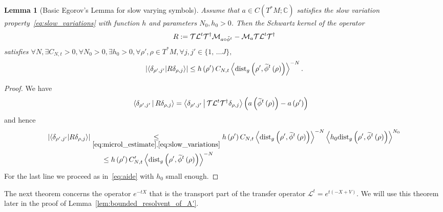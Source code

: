 \documentclass[10pt]{amsart}
\newtheorem{lemm}[theo]{Lemma}\newtheorem{prop}[theo]{Proposition}\newtheorem{coro}[theo]{Corollary}\newtheorem{conj}[theo]{Conjecture}
\theoremstyle{definition}\newtheorem{defi}[theo]{Definition}\newtheorem{rema}[theo]{Remark}\newtheorem{exam}[theo]{Example}\newtheorem{exem}[theo]{Example}\newtheorem{nota}[theo]{Notation}
\newcommand{\clT}{\mathcal{T}}
\newcommand{\clL}{\mathcal{L}}
\newcommand{\clM}{\mathcal{M}}
\newcommand{\dist}{\mathrm{dist}}
\newcommand{\bbC}{\mathbb{C}}
\let\oldtilde\tilde
\renewcommand*{\tilde}[1]{\mathchoice{\widetilde{#1}}{\widetilde{#1}}{\oldtilde{#1}}{\oldtilde{#1}}}
\let\oldexists\exists
\renewcommand*{\exists}{\mathrel{\oldexists}}
\let\oldforall\forall
\renewcommand*{\forall}{\mathrel{\oldforall}}
\begin{document}
\begin{cBoxB}{}
\begin{lemm}[Basic Egorov's Lemma for slow varying symbols]\label{lem:Basic_Egorov_lemma}
Assume that $a\in C(T^{*}M;\bbC)$ satisfies the slow variation property~\eqref{eq:slow_variations} with function $h$ and parameters $N_{0},h_{0}>0$. Then the Schwartz kernel of the operator
\[
R:=\clT\clL^{t}\clT^{\dagger}\clM_{a\circ\tilde{\phi}^{t}}-\clM_{a}\clT\clL^{t}\clT^{\dagger}
\]
satisfies $\forall N,\exists C_{N,t}>0,\forall N_{0}>0,\exists h_{0}>0,\forall\rho',\rho\in T^{*}M,\forall j,j'\in\{ 1,\,\ldots J\},$
\begin{equation}\label{eq:Egorov_Lemma}
\left|\langle\delta_{\rho',j'}|R\delta_{\rho,j}\rangle\right|\leq h\left(\rho'\right)C_{N,t}\left\langle \dist_{g}\left(\rho',\tilde{\phi}^{t}\left(\rho\right)\right)\right\rangle ^{-N}.
\end{equation}
\end{lemm}
\end{cBoxB}

\begin{proof}
We have
\begin{align*}
\left\langle\delta_{\rho',j'}\,\middle|\,R\delta_{\rho,j}\right\rangle & =\left\langle\delta_{\rho',j'}\,\middle|\,\clT\clL^{t}\clT^{\dagger}\delta_{\rho,j}\right\rangle\left(a\left(\tilde{\phi}^{t}\left(\rho\right)\right)-a\left(\rho'\right)\right)
\end{align*}
and hence
\begin{align*}
\left|\langle\delta_{\rho',j'}|R\delta_{\rho,j}\rangle\right| & \underset{\eqref{eq:microl_estimate},\eqref{eq:slow_variations}}{\leq}h\left(\rho'\right)C_{N,t}\left\langle \dist_{g}\left(\rho',\tilde{\phi}^{t}\left(\rho\right)\right)\right\rangle ^{-N}\left\langle h_{0}\dist_{g}\left(\rho',\tilde{\phi}^{t}\left(\rho\right)\right)\right\rangle ^{N_{0}}\\
& \mkern28mu\leq h\left(\rho'\right)C'_{N,t}\left\langle \dist_{g}\left(\rho',\tilde{\phi}^{t}\left(\rho\right)\right)\right\rangle ^{-N}
\end{align*}
For the last line we proceed as in~\eqref{eq:aide} with $h_{0}$ small enough.
\end{proof}

The next theorem concerns the operator $e^{-tX}$ that is the transport part of the transfer operator $\clL^{t}=e^{t(-X+V)}$. We will use this theorem later in the proof of Lemma~\ref{lem:bounded_resolvent_of_A'}.
\end{document}
